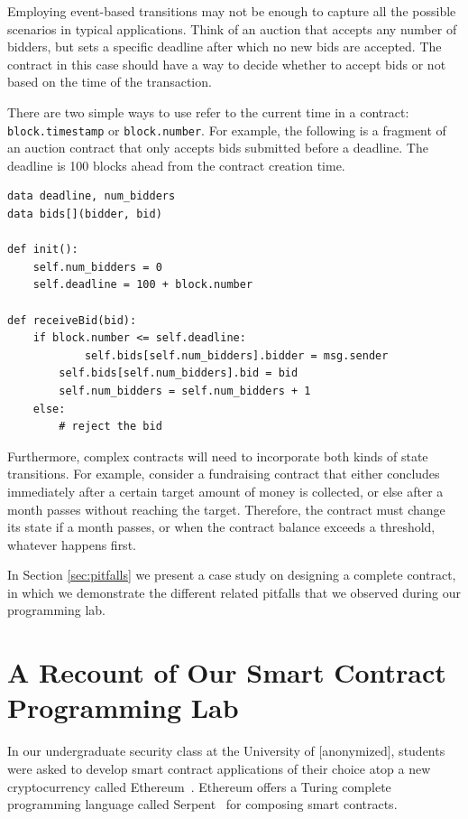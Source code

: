 \documentclass[10pt,twocolumn,letterpaper]{article}
\newcommand{\elaine}[1]{}
\begin{document}
{Employing event-based transitions may not be enough to capture all the possible scenarios in typical applications. Think of an auction that accepts any number of bidders, but sets a specific deadline after which no new bids are accepted. The contract in this case should have a way to decide whether to accept bids or not based on the time of the transaction.

There are two simple ways to use refer to the current time in a contract: \texttt{block.timestamp} or \texttt{block.number}. For example, the following is a fragment of an auction contract that only accepts bids submitted before a deadline. The deadline is 100 blocks ahead from the contract creation time.

\begin{mdframed}
\begin{verbatim}
data deadline, num_bidders
data bids[](bidder, bid)

def init():
	self.num_bidders = 0
	self.deadline = 100 + block.number                

def receiveBid(bid):
	if block.number <= self.deadline:
    		self.bids[self.num_bidders].bidder = msg.sender
		self.bids[self.num_bidders].bid = bid
		self.num_bidders = self.num_bidders + 1
	else:
		# reject the bid
\end{verbatim}
\end{mdframed}                

Furthermore, complex contracts will need to incorporate both kinds of state transitions. For example, consider a fundraising contract that either concludes immediately after a certain target amount of money is collected, or else after a month passes without reaching the target. Therefore, the contract must change its state if a month passes, or when the contract balance exceeds a threshold, whatever happens first.

In Section \ref{sec:pitfalls} we present a case study on designing a complete contract, in which we demonstrate the different related pitfalls that we observed during our programming lab.
}

\section{A Recount of Our Smart Contract Programming Lab}
\label{sec:lab}
In our undergraduate security class at the University of [anonymized], 
students were asked to develop smart contract applications of their choice
atop a new cryptocurrency called Ethereum~\cite{ethereum}. %
Ethereum offers a Turing complete programming language
called Serpent~\cite{serpent} for composing smart contracts. 
\end{document}
